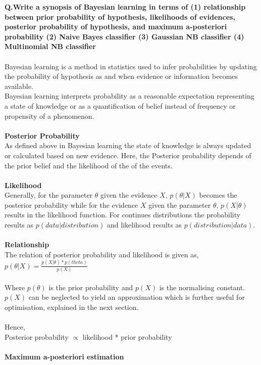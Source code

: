\documentclass {article}
\begin{document}
\textbf{Q.Write a synopsis of Bayesian learning in terms of (1) relationship between prior probability of hypothesis, likelihoods of evidences, posterior probability of hypothesis, and maximum a-posteriori probability  (2) Naive Bayes classifier (3) Gaussian NB classifier (4) Multinomial NB classifier } \\
\\
Bayesian learning is a method in statistics used to infer probabilities by updating the probability of hypothesis as and when evidence or information becomes available. \\
Bayesian learning interprets probability as a reasonable expectation representing a state of knowledge or as a quantification of belief instead of frequency or propensity of a phenomenon. \\
\\
\textbf{Posterior Probability} \\
As defined above in Bayesian learning the state of knowledge is always updated or calculated based on new evidence. Here, the Posterior probability depends of the prior belief and the likelihood of the of the events. \\
\\
\textbf{Likelihood} \\
Generally, for the parameter $\theta$ given the evidence $X$, $p(\theta | X)$ becomes the posterior probability while for the evidence $X$ given the parameter $\theta$, $p(X | \theta)$results in the likelihood function. 
For continues distributions the probability results as $p(data | distribution)$ and likelihood results as $p(distribution | data)$. \\
\\
 \textbf{Relationship} \\
The relation of posterior probability and likelihood is given as, \\
$p(\theta | X) = \frac{p(X | \theta) * p(theta)}{p(X)}$ \\
\\
Where $p(\theta)$ is the prior probability and $p(X)$ is the normalising constant. $p(X)$ can be neglected to yield an approximation which is further useful for optimisation, explained in the next section. \\
\\
Hence, \\
Posterior probability $\propto$ likelihood * prior probability \\
\\
\textbf{Maximum a-posteriori estimation} \\
\end{document}
